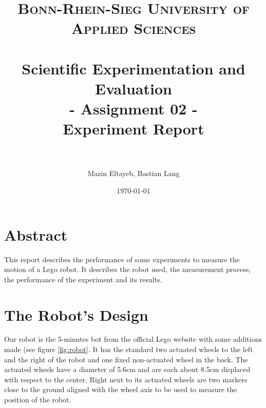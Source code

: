 \documentclass[paper=a4, fontsize=11pt]{scrartcl} %
\title{	
\normalfont \normalsize 
\textsc{Bonn-Rhein-Sieg University of Applied Sciences} \\ [25pt] %
\horrule{0.5pt} \\[0.4cm] %
\huge Scientific Experimentation and Evaluation\\
- Assignment 02 - \\ 
Experiment Report \\%
\horrule{2pt} \\[0.5cm] %
}
\author{Mazin Eltayeb, Bastian Lang} %
\date{\normalsize\today} %
\numberwithin{equation}{section} %
\numberwithin{figure}{section} %
\numberwithin{table}{section} %
\begin{document}
\maketitle %

\tableofcontents
\newpage

\section{Abstract}
This report describes the performance of some experiments to measure the motion of a Lego robot.
It describes the robot used, the measurement process, the performance of the experiment and its results.



\section{The Robot's Design}
Our robot is the 5-minutes bot from the official Lego website with some additions made (see figure \ref{fig:robot}. 
It has the standard two actuated wheels to the left and the right of the robot and one fixed non-actuated wheel in the back. 
The actuated wheels have a diameter of 5.6cm and are each about 8.5cm displaced with respect to the center. 
Right next to its actuated wheels are two markers close to the ground aligned with the wheel axis to be used to measure the position of the robot.
\end{document}
